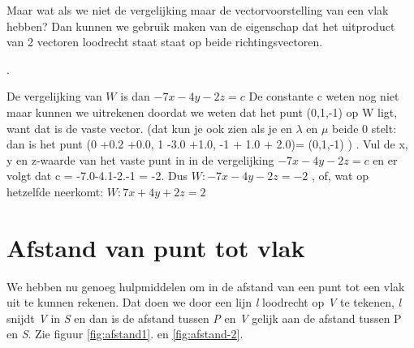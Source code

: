 \documentclass[hidelinks, a4wide, 12pt,  twoside]{book}
\begin{document}

Maar wat als we niet de vergelijking maar de vectorvoorstelling van een vlak hebben? Dan kunnen we gebruik maken van de eigenschap dat  het uitproduct van 2 vectoren loodrecht staat staat op beide richtingsvectoren. 

.


De vergelijking van $ W $ is dan  $ -7x-4y-2z = c $ De constante c weten nog niet maar kunnen we uitrekenen doordat we weten dat het punt (0,1,-1) op W ligt, want dat is de vaste vector. (dat kun je ook zien als je en $ \lambda $  en $ \mu $  beide 0 stelt: dan is het punt (0 +0.2 +0.0, 1 -3.0 +1.0, -1 + 1.0 + 2.0)= (0,1,-1)  ) .
Vul de x, y en z-waarde van het vaste punt  in in de vergelijking $ -7x-4y-2z = c $ en er volgt dat c = -7.0-4.1-2.-1 = -2. Dus $ W: -7x-4y-2z = -2 $ , of, wat op hetzelfde neerkomt:  $ W: 7x+4y+2z = 2 $

\section{Afstand van punt tot vlak}
We hebben nu genoeg hulpmiddelen om in \RD de afstand van een punt tot een vlak uit te kunnen rekenen. Dat doen we   door een lijn \textit{l} loodrecht op \textit{V} te tekenen,\textit{ l }snijdt \textit{V} in\textit{ S} en dan is de afstand tussen \textit{P} en \textit{V} gelijk aan de afstand tussen P\textit{} en \textit{S}. Zie figuur   \ref{fig:afstand1}. en \ref{fig:afstand-2}.
\end{document}
